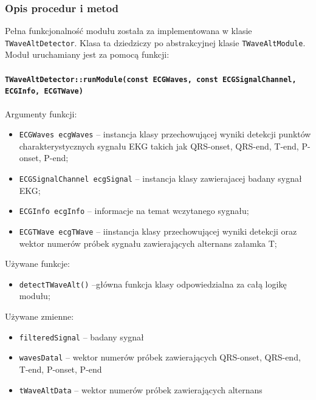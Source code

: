 \documentclass[a4paper, 11pt]{article}
\begin{document}
\subsubsection{Opis procedur i metod}
\label{sec::t_wave_alt:procs}

Pełna funkcjonalność modułu została za implementowana w klasie \verb|TWaveAltDetector|. Klasa ta dziedziczy po abstrakcyjnej klasie  \verb|TWaveAltModule|. Moduł uruchamiany jest za pomocą funkcji: 

\paragraph{\texttt{TWaveAltDetector::runModule(const ECGWaves, const ECGSignalChannel, ECGInfo, ECGTWave)}}

\medskip{}

Argumenty funkcji:

\begin{itemize}
\item \verb+ECGWaves ecgWaves+ -- instancja klasy przechowującej wyniki detekcji punktów charakterystycznych sygnału EKG takich jak QRS-onset, QRS-end, T-end, P-onset, P-end;
\item \verb+ECGSignalChannel ecgSignal+ -- instancja klasy zawierajacej badany sygnał EKG;
\item \verb+ECGInfo ecgInfo+ -- informacje na temat wczytanego sygnału;
\item \verb+ECGTWave ecgTWave+ -- iinstancja klasy przechowującej wyniki detekcji oraz wektor numerów próbek sygnału zawierających alternans załamka T;
\end{itemize}
\medskip{}

Używane funkcje:
\begin{itemize}
\item \verb+detectTWaveAlt()+ --główna funkcja klasy odpowiedzialna za całą logikę modułu;
\end{itemize}

\medskip{}

Używane zmienne:
\begin{itemize}
\item \verb+filteredSignal+ --  badany sygnał
\item \verb+wavesDatal+ -- wektor numerów próbek zawierających QRS-onset, QRS-end, T-end, P-onset, P-end
\item \verb+tWaveAltData+ -- wektor numerów próbek zawierających alternans
\end{itemize}
\end{document}
